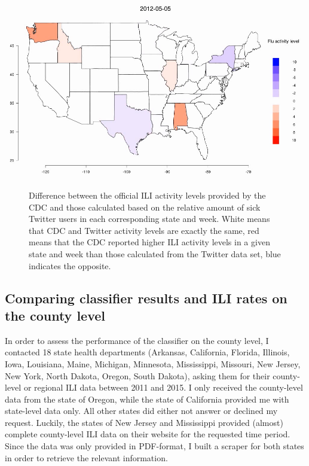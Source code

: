 \documentclass[11pt, a4paper,twoside]{report}\usepackage[]{graphicx}\usepackage[]{color}
\begin{document}
\begin{center}
\href{run:vids/4_cdc_twitter_diff_user_state.avi}{\includegraphics[width=0.9\linewidth]{vids/4_cdc_twitter_diff_user_state.png}}
\end{center}
\begin{figure}[htbp!]
\centering
  \caption{Difference between the official ILI activity levels provided by the CDC and those calculated based on the relative amount of sick Twitter users in each corresponding state and week. White means that CDC and Twitter activity levels are exactly the same, red means that the CDC reported higher ILI activity levels in a given state and week than those calculated from the Twitter data set, blue indicates the opposite.}
    \label{fig:cdc_twitter_comp_state}
\end{figure}

\subsection{Comparing classifier results and ILI rates on the county level}
\label{sec:comp_cdc_county}
In order to assess the performance of the classifier on the county level, I contacted 18 state health departments (Arkansas, California, Florida, Illinois, Iowa, Louisiana, Maine, Michigan, Minnesota, Mississippi, Missouri, New Jersey, New York, North Dakota, Oregon, South Dakota), asking them for their county-level or regional ILI data between 2011 and 2015. I only received the county-level data from the state of Oregon, while the state of California provided me with state-level data only. All other states did either not answer or declined my request. Luckily, the states of New Jersey and Mississippi provided (almost) complete county-level ILI data on their website for the requested time period. Since the data was only provided in PDF-format, I built a scraper for both states in order to retrieve the relevant information. 
\end{document}

